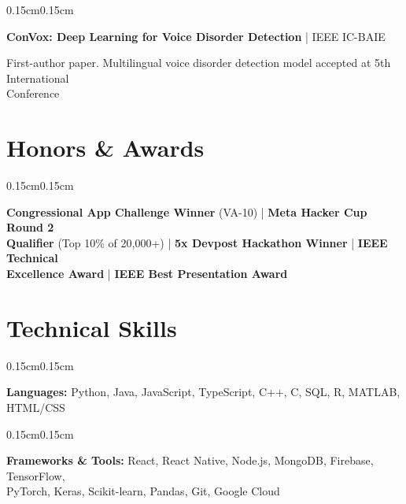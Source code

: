 \documentclass[10pt, letterpaper]{article}
\newenvironment{onecolentry}{
    \begin{adjustwidth}{0.15cm}{0.15cm}
}{
    \end{adjustwidth}
}
\begin{document}
    \vspace{0.1cm}

    \begin{onecolentry}
        \textbf{ConVox: Deep Learning for Voice Disorder Detection} | IEEE IC-BAIE
        
        \vspace{0.05cm}
        First-author paper. Multilingual voice disorder detection model accepted at 5th International\\Conference
    \end{onecolentry}

    \section{Honors \& Awards}

    \begin{onecolentry}
        \textbf{Congressional App Challenge Winner} (VA-10) | \textbf{Meta Hacker Cup Round 2\\Qualifier} (Top 10\% of 20,000+) | \textbf{5x Devpost Hackathon Winner} | \textbf{IEEE Technical\\Excellence Award} | \textbf{IEEE Best Presentation Award}
    \end{onecolentry}

    \section{Technical Skills}

    \begin{onecolentry}
        \textbf{Languages:} Python, Java, JavaScript, TypeScript, C++, C, SQL, R, MATLAB, HTML/CSS
    \end{onecolentry}

    \vspace{0.05cm}

    \begin{onecolentry}
        \textbf{Frameworks \& Tools:} React, React Native, Node.js, MongoDB, Firebase, TensorFlow,\\PyTorch, Keras, Scikit-learn, Pandas, Git, Google Cloud
    \end{onecolentry}
\end{document}
